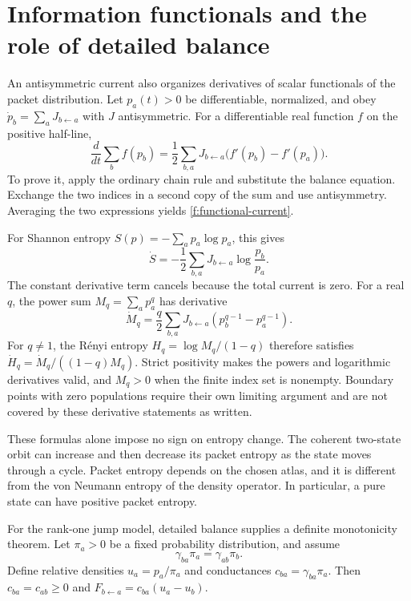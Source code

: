 \section{Information functionals and the role of detailed balance}\label{f:information}

An antisymmetric current also organizes derivatives of scalar functionals of the packet distribution. Let $p_a(t)>0$ be differentiable, normalized, and obey $\dot p_b=\sum_aJ_{b\leftarrow a}$ with $J$ antisymmetric. For a differentiable real function $f$ on the positive half-line,
\begin{equation}\label{f:functional-current}
 \frac{d}{dt}\sum_b f(p_b)
 =\frac12\sum_{b,a}J_{b\leftarrow a}
       \bigl(f'(p_b)-f'(p_a)\bigr).
\end{equation}
To prove it, apply the ordinary chain rule and substitute the balance equation. Exchange the two indices in a second copy of the sum and use antisymmetry. Averaging the two expressions yields \eqref{f:functional-current}.

For Shannon entropy $S(p)=-\sum_ap_a\log p_a$, this gives
\begin{equation}\label{f:entropy-current}
 \dot S=-\frac12\sum_{b,a}J_{b\leftarrow a}\log\frac{p_b}{p_a}.
\end{equation}
The constant derivative term cancels because the total current is zero. For a real $q$, the power sum $M_q=\sum_ap_a^q$ has derivative
\[
 \dot M_q=\frac q2\sum_{b,a}J_{b\leftarrow a}
 (p_b^{q-1}-p_a^{q-1}).
\]
For $q\ne1$, the R\'enyi entropy $H_q=\log M_q/(1-q)$ therefore satisfies
$\dot H_q=\dot M_q/((1-q)M_q)$. Strict positivity makes the powers and logarithmic derivatives valid, and $M_q>0$ when the finite index set is nonempty. Boundary points with zero populations require their own limiting argument and are not covered by these derivative statements as written.

These formulas alone impose no sign on entropy change. The coherent two-state orbit can increase and then decrease its packet entropy as the state moves through a cycle. Packet entropy depends on the chosen atlas, and it is different from the von Neumann entropy of the density operator. In particular, a pure state can have positive packet entropy.

For the rank-one jump model, detailed balance supplies a definite monotonicity theorem. Let $\pi_a>0$ be a fixed probability distribution, and assume
\begin{equation}\label{f:detailed-balance}
 \gamma_{ba}\pi_a=\gamma_{ab}\pi_b.
\end{equation}
Define relative densities $u_a=p_a/\pi_a$ and conductances $c_{ba}=\gamma_{ba}\pi_a$. Then $c_{ba}=c_{ab}\ge0$ and
$F_{b\leftarrow a}=c_{ba}(u_a-u_b)$.

